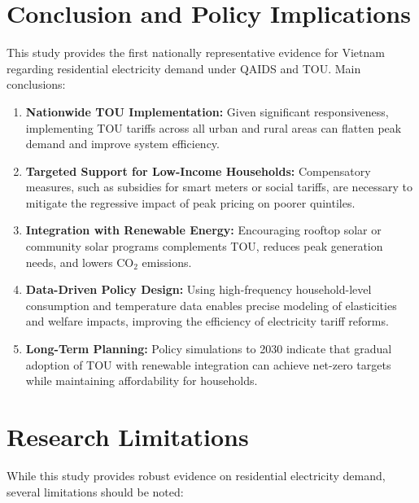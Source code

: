 \documentclass[12pt,a4paper]{article}
\begin{document}
	\section{Conclusion and Policy Implications}
	This study provides the first nationally representative evidence for Vietnam regarding residential electricity demand under QAIDS and TOU. Main conclusions:
	\begin{enumerate}
		\item \textbf{Nationwide TOU Implementation:} Given significant responsiveness, implementing TOU tariffs across all urban and rural areas can flatten peak demand and improve system efficiency.
		\item \textbf{Targeted Support for Low-Income Households:} Compensatory measures, such as subsidies for smart meters or social tariffs, are necessary to mitigate the regressive impact of peak pricing on poorer quintiles.
		\item \textbf{Integration with Renewable Energy:} Encouraging rooftop solar or community solar programs complements TOU, reduces peak generation needs, and lowers CO$_2$ emissions.
		\item \textbf{Data-Driven Policy Design:} Using high-frequency household-level consumption and temperature data enables precise modeling of elasticities and welfare impacts, improving the efficiency of electricity tariff reforms.
		\item \textbf{Long-Term Planning:} Policy simulations to 2030 indicate that gradual adoption of TOU with renewable integration can achieve net-zero targets while maintaining affordability for households.
	\end{enumerate}
	
\section{Research Limitations}

While this study provides robust evidence on residential electricity demand, several limitations should be noted:
\end{document}
